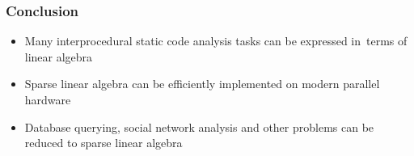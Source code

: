 \documentclass[xcolor=table]{beamer}
\begin{document}
\begin{frame}[fragile] \frametitle{Conclusion}
  \begin{itemize}
    \item Many interprocedural static code analysis tasks can be expressed in~terms of linear algebra
    \item Sparse linear algebra can be efficiently implemented on modern parallel hardware
    \item Database querying, social network analysis and other problems can be reduced to sparse linear algebra
  \end{itemize}
\end{frame}
\end{document}
